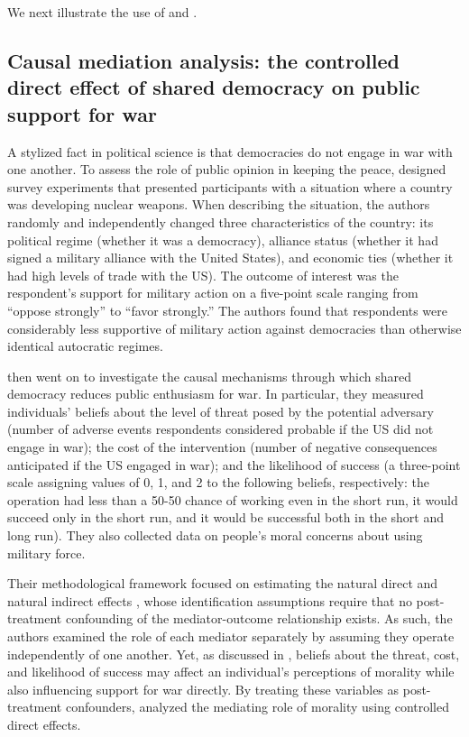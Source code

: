 We next illustrate the use of  and .

\hypertarget{causal-mediation-example}{%
\subsection{Causal mediation analysis: the controlled direct effect of
shared democracy on public support for
war}\label{causal-mediation-example}}

A stylized fact in political science is that democracies do not engage
in war with one another. To assess the role of public opinion in keeping
the peace, \citet{tomzPublicOpinionDemocratic2013a} designed survey
experiments that presented participants with a situation where a country
was developing nuclear weapons. When describing the situation, the
authors randomly and independently changed three characteristics of the
country: its political regime (whether it was a democracy), alliance
status (whether it had signed a military alliance with the United
States), and economic ties (whether it had high levels of trade with the
US). The outcome of interest was the respondent's support for military
action on a five-point scale ranging from ``oppose strongly'' to ``favor
strongly.'' The authors found that respondents were considerably less
supportive of military action against democracies than otherwise
identical autocratic regimes.

\citet{tomzPublicOpinionDemocratic2013a} then went on to investigate the
causal mechanisms through which shared democracy reduces public
enthusiasm for war. In particular, they measured individuals' beliefs
about the level of threat posed by the potential adversary (number of
adverse events respondents considered probable if the US did not engage
in war); the cost of the intervention (number of negative consequences
anticipated if the US engaged in war); and the likelihood of success (a
three-point scale assigning values of 0, 1, and 2 to the following
beliefs, respectively: the operation had less than a 50-50 chance of
working even in the short run, it would succeed only in the short run,
and it would be successful both in the short and long run). They also
collected data on people's moral concerns about using military force.

Their methodological framework focused on estimating the natural direct
and natural indirect effects
\citep{imaiUnpackingBlackBox2011, imaiIdentificationInferenceSensitivity2010},
whose identification assumptions require that no post-treatment
confounding of the mediator-outcome relationship exists. As such, the
authors examined the role of each mediator separately by assuming they
operate independently of one another. Yet, as discussed in
\citet{zhouResidualBalancingMethod2020a}, beliefs about the threat,
cost, and likelihood of success may affect an individual's perceptions
of morality while also influencing support for war directly. By treating
these variables as post-treatment confounders,
\citet{zhouResidualBalancingMethod2020a} analyzed the mediating role of
morality using controlled direct effects.

